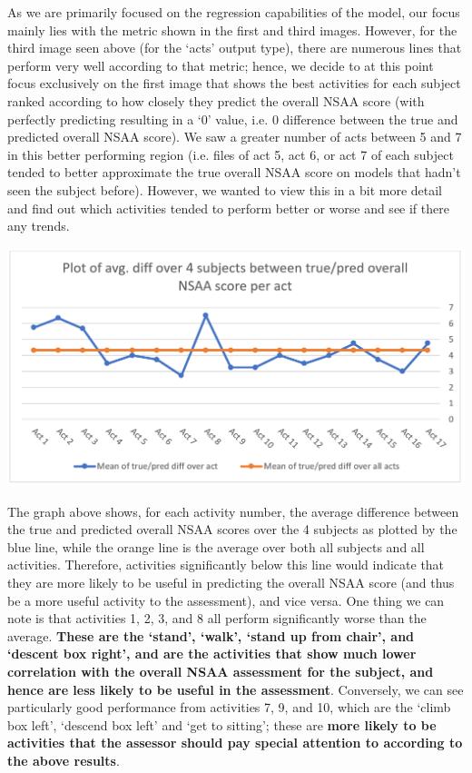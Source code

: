 \documentclass[12pt,twoside]{report}
\begin{document}
\quad As we are primarily focused on the regression capabilities of the model, our focus mainly lies with the metric shown in the first and third images. However, for the third image seen above (for the ‘acts’ output type), there are numerous lines that perform very well according to that metric; hence, we decide to at this point focus exclusively on the first image that shows the best activities for each subject ranked according to how closely they predict the overall NSAA score (with perfectly predicting resulting in a ‘0’ value, i.e. 0 difference between the true and predicted overall NSAA score). We saw a greater number of acts between 5 and 7 in this better performing region (i.e. files of act 5, act 6, or act 7 of each subject tended to better approximate the true overall NSAA score on models that hadn’t seen the subject before). However, we wanted to view this in a bit more detail and find out which activities tended to perform better or worse and see if there any trends.

\begin{center}
\includegraphics[scale=0.4]{project_figures/fig11_14}
\end{center}

\quad The graph above shows, for each activity number, the average difference between the true and predicted overall NSAA scores over the 4 subjects as plotted by the blue line, while the orange line is the average over both all subjects and all activities. Therefore, activities significantly below this line would indicate that they are more likely to be useful in predicting the overall NSAA score (and thus be a more useful activity to the assessment), and vice versa. One thing we can note is that activities 1, 2, 3, and 8 all perform significantly worse than the average. \textbf{These are the ‘stand’, ‘walk’, ‘stand up from chair’, and ‘descent box right’, and are the activities that show much lower correlation with the overall NSAA assessment for the subject, and hence are less likely to be useful in the assessment}. Conversely, we can see particularly good performance from activities 7, 9, and 10, which are the ‘climb box left’, ‘descend box left’ and ‘get to sitting’; these are \textbf{more likely to be activities that the assessor should pay special attention to according to the above results}.\\
\end{document}
